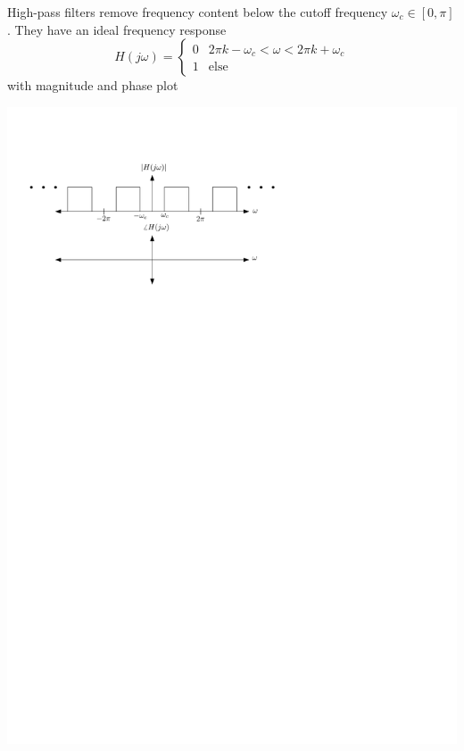 High-pass filters remove frequency content below the cutoff frequency $\omega_c\in [0,\pi]$. They have an ideal frequency response
\[
H(j\omega) = \left\{ \begin{array}{lc}
  0 & 2\pi k -\omega_c < \omega < 2\pi k + \omega_c\\
  1 & \text{else}
\end{array}
\right. 
\]
with magnitude and phase plot
\begin{center}
  \includegraphics[scale=1]{graphics/highpass-ideal-dt.pdf}
\end{center}

